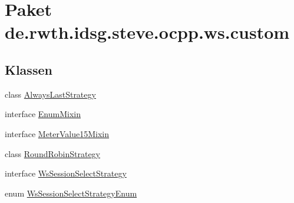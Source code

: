\hypertarget{namespacede_1_1rwth_1_1idsg_1_1steve_1_1ocpp_1_1ws_1_1custom}{\section{Paket de.\-rwth.\-idsg.\-steve.\-ocpp.\-ws.\-custom}
\label{namespacede_1_1rwth_1_1idsg_1_1steve_1_1ocpp_1_1ws_1_1custom}
}
\subsection*{Klassen}
\begin{DoxyCompactItemize}
\item 
class \hyperlink{classde_1_1rwth_1_1idsg_1_1steve_1_1ocpp_1_1ws_1_1custom_1_1_always_last_strategy}{Always\-Last\-Strategy}
\item 
interface \hyperlink{interfacede_1_1rwth_1_1idsg_1_1steve_1_1ocpp_1_1ws_1_1custom_1_1_enum_mixin}{Enum\-Mixin}
\item 
interface \hyperlink{interfacede_1_1rwth_1_1idsg_1_1steve_1_1ocpp_1_1ws_1_1custom_1_1_meter_value15_mixin}{Meter\-Value15\-Mixin}
\item 
class \hyperlink{classde_1_1rwth_1_1idsg_1_1steve_1_1ocpp_1_1ws_1_1custom_1_1_round_robin_strategy}{Round\-Robin\-Strategy}
\item 
interface \hyperlink{interfacede_1_1rwth_1_1idsg_1_1steve_1_1ocpp_1_1ws_1_1custom_1_1_ws_session_select_strategy}{Ws\-Session\-Select\-Strategy}
\item 
enum \hyperlink{enumde_1_1rwth_1_1idsg_1_1steve_1_1ocpp_1_1ws_1_1custom_1_1_ws_session_select_strategy_enum}{Ws\-Session\-Select\-Strategy\-Enum}
\end{DoxyCompactItemize}

